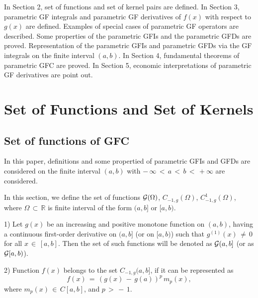 \documentclass[12pt]{article}
\begin{document}
In Section 2, set of functions and set of kernel pairs are defined.
In Section 3, parametric GF integrals and parametric GF derivatives of $f(x)$ with respect to $g(x)$ are defined.
Examples of special cases of parametric GF operators are described.
Some properties of the parametric GFIs and the parametric GFDs are proved.
Representation of the parametric GFIs and parametric GFDs via the GF integrals on the finite interval $(a,b)$.
In Section 4, fundamental theorems of parametric GFC are proved.
In Section 5, economic interpretations of parametric GF derivatives are point out.






\section{Set of Functions and Set of Kernels}


\subsection{Set of functions of GFC}

In this paper, definitions and some propertied of parametric GFIs and GFDs are considered on the finite interval $(a,b)$ with $ - \, \infty \, < \, a \, < \, b \, < \, +\infty$ are considered. 

In this section, we define the set of functions ${\cal G}(\Omega)$, $C_{-1,g}(\Omega)$, $C^1_{-1,g}(\Omega)$, where $\Omega \, \subset \, \mathbb{R}$ is finite interval of the form $(a,b]$ or $[a,b)$. 

1) Let $g(x)$ be an increasing and positive monotone function on $(a, b)$, having a continuous first-order derivative 
on $(a,b]$ (or on $[a,b)$) such that $g^{(1)}(x) \, \ne \, 0$ for all $x \, \in \, [a,b]$.
Then the set of such functions will be denoted as ${\cal G}(a,b]$ (or as ${\cal G}[a,b)$).

2) Function $f(x)$ belongs to the set $C_{-1,g}(a,b]$, if it
can be represented as
\[
f(x) \, = \, (g(x) \, - \, g(a))^{p} \, m_p(x) ,
\]
where $m_p(x) \, \in \, C[a,b]$, and $p \, > \, - \, 1$.
\end{document}
